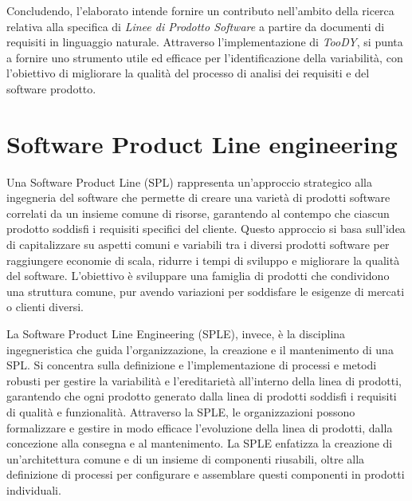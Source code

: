 \documentclass[12pt]{report}
\newcommand{\toody}{\textsl{TooDY}\xspace}
\begin{document}

\vspace{1cm}\noindent
Concludendo, l’elaborato intende fornire un contributo nell’ambito della ricerca relativa alla specifica di \textit{Linee di Prodotto Software} a partire da documenti di requisiti in linguaggio naturale. Attraverso l’implementazione di \toody, si punta a fornire uno strumento utile ed efficace per l’identificazione della variabilità, con l’obiettivo di migliorare la qualità del processo di analisi dei requisiti e del software prodotto.


\chapter{Software Product Line engineering}
Una Software Product Line (SPL) rappresenta un'approccio strategico alla ingegneria del software che permette di creare una varietà di prodotti software correlati da un insieme comune di risorse, garantendo al contempo che ciascun prodotto soddisfi i requisiti specifici del cliente. Questo approccio si basa sull'idea di capitalizzare su aspetti comuni e variabili tra i diversi prodotti software per raggiungere economie di scala, ridurre i tempi di sviluppo e migliorare la qualità del software. L'obiettivo è sviluppare una famiglia di prodotti che condividono una struttura comune, pur avendo variazioni per soddisfare le esigenze di mercati o clienti diversi.

La Software Product Line Engineering (SPLE), invece, è la disciplina ingegneristica che guida l'organizzazione, la creazione e il mantenimento di una SPL. Si concentra sulla definizione e l'implementazione di processi e metodi robusti per gestire la variabilità e l'ereditarietà all'interno della linea di prodotti, garantendo che ogni prodotto generato dalla linea di prodotti soddisfi i requisiti di qualità e funzionalità. Attraverso la SPLE, le organizzazioni possono formalizzare e gestire in modo efficace l'evoluzione della linea di prodotti, dalla concezione alla consegna e al mantenimento. La SPLE enfatizza la creazione di un'architettura comune e di un insieme di componenti riusabili, oltre alla definizione di processi per configurare e assemblare questi componenti in prodotti individuali.
\end{document}
